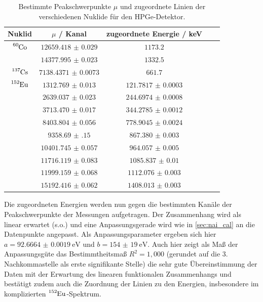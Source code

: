 \begin{table}[h]
    \centering
    \begin{tabular}{|c|c|c|c|c|} \hline
    Nuklid & $\mu$ / Kanal & zugeordnete Energie / keV \\ \hline
    \hline
    $\ce{^60Co}$ & $\num{12659.418(29)}$ &  $\num{1173.2}$\\
    &  $\num{14377.995(23)}$ &  $\num{1332.5}$ \\
    \hline
    $\ce{^137Cs}$ & $\num{7138.4371(73)}$ & $\num{661.7}$ \\
    \hline
    $\ce{^152Eu}$ & $\num{1312.769(13)}$ & $\num{121.7817(3)}$ \\
    & $\num{2639.037(23)}$ & $\num{244.6974(8)}$ \\
    & $ \num{3713.470(17)}$ & $\num{344.2785(12)}$ \\
    & $ \num{8403.804(56)}$ & $\num{778.9045(24)}$ \\
    & $ \num{9358.69(15)}$ & $\num{867.380(3)}$ \\
    & $ \num{10401.745(57)}$ & $\num{964.057(5)}$ \\
    & $ \num{11716.119(83)}$ & $\num{1085.837(10)}$ \\
    & $ \num{11999.159(68)}$ & $\num{1112.076(3)}$ \\
    & $ \num{15192.416(62)}$ &$\num{1408.013(3)}$ \\
	\hline
    \end{tabular}
    \caption{Bestimmte Peakschwerpunkte $\mu$ und zugeordnete Linien der verschiedenen Nuklide für den HPGe-Detektor.}
    \label{tab:zuordnungen_ge}
\end{table}

Die zugeordneten Energien werden nun gegen die bestimmten Kanäle der Peakschwerpunkte der Messungen aufgetragen. Der Zusammenhang wird als linear erwartet (s.o.) und eine Anpassungsgerade wird wie in \ref{sec:nai_cal} an die Datenpunkte angepasst. Als Anpassungsparameter ergeben sich hier $a = \SI{92.6664(19)}{\eV}$ und $b = \SI{154(19)}{\eV}$. Auch hier zeigt als Maß der Anpassungsgüte das Bestimmtheitsmaß $R^2=1,000$ (gerundet auf die 3. Nachkommastelle als erste signifikante Stelle) die sehr gute Übereinstimmung der Daten mit der Erwartung des linearen funktionalen Zusammenhangs und bestätigt zudem auch die Zuordnung der Linien zu den Energien, insbesondere im komplizierten $\ce{^152Eu}$-Spektrum.



